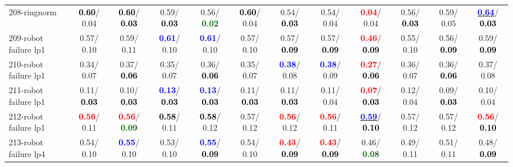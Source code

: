 \begin{table}[h]
\begin{center}
{\begin{tabular}{lc|c|c|c|c|c|c|c|c|c|c}
208-ringnorm & \textcolor{black}{\textbf{  0.60}}/  0.04 & \textcolor{black}{\textbf{  0.60}}/\textcolor{black}{\textbf{  0.03}} &   0.59/\textcolor{black}{\textbf{  0.03}} &   0.56/\textcolor{darkgreen}{\textbf{  0.02}} & \textcolor{black}{\textbf{  0.60}}/  0.04 &   0.54/\textcolor{black}{\textbf{  0.03}} &   0.54/  0.04 & \textcolor{red}{\textbf{  0.04}}/  0.04 &   0.56/\textcolor{black}{\textbf{  0.03}} &   0.59/  0.05 & \underline{\textcolor{blue}{\textbf{  0.64}}}/\textcolor{black}{\textbf{  0.03}} \\
209-robot failure lp1 &   0.57/  0.10 &   0.59/  0.11 & \textcolor{blue}{\textbf{  0.61}}/  0.10 & \textcolor{blue}{\textbf{  0.61}}/  0.10 &   0.57/  0.10 &   0.57/\textcolor{black}{\textbf{  0.09}} &   0.57/\textcolor{black}{\textbf{  0.09}} & \textcolor{red}{\textbf{  0.46}}/\textcolor{black}{\textbf{  0.09}} &   0.55/  0.10 &   0.56/\textcolor{black}{\textbf{  0.09}} &   0.59/\textcolor{black}{\textbf{  0.09}} \\
210-robot failure lp1 &   0.34/  0.07 &   0.37/\textcolor{black}{\textbf{  0.06}} &   0.35/  0.07 &   0.36/\textcolor{black}{\textbf{  0.06}} &   0.35/  0.07 & \textcolor{blue}{\textbf{  0.38}}/  0.08 & \textcolor{blue}{\textbf{  0.38}}/  0.09 & \textcolor{red}{\textbf{  0.27}}/\textcolor{black}{\textbf{  0.06}} &   0.36/  0.07 &   0.36/\textcolor{black}{\textbf{  0.06}} &   0.37/  0.08 \\
211-robot failure lp1 &   0.11/\textcolor{black}{\textbf{  0.03}} &   0.10/\textcolor{black}{\textbf{  0.03}} & \textcolor{blue}{\textbf{  0.13}}/\textcolor{black}{\textbf{  0.03}} & \textcolor{blue}{\textbf{  0.13}}/\textcolor{black}{\textbf{  0.03}} &   0.11/\textcolor{black}{\textbf{  0.03}} &   0.11/\textcolor{black}{\textbf{  0.03}} &   0.11/  0.04 & \textcolor{red}{\textbf{  0.07}}/\textcolor{black}{\textbf{  0.03}} &   0.12/  0.04 &   0.09/\textcolor{black}{\textbf{  0.03}} &   0.10/  0.04 \\
212-robot failure lp1 & \textcolor{red}{\textbf{  0.56}}/  0.11 & \textcolor{red}{\textbf{  0.56}}/\textcolor{darkgreen}{\textbf{  0.09}} & \textcolor{black}{\textbf{  0.58}}/  0.11 & \textcolor{black}{\textbf{  0.58}}/  0.12 &   0.57/  0.12 & \textcolor{red}{\textbf{  0.56}}/  0.12 & \textcolor{red}{\textbf{  0.56}}/  0.11 & \underline{\textcolor{blue}{\textbf{  0.59}}}/\textcolor{black}{\textbf{  0.10}} &   0.57/  0.12 &   0.57/  0.12 & \textcolor{red}{\textbf{  0.56}}/\textcolor{black}{\textbf{  0.10}} \\
213-robot failure lp4 &   0.54/  0.10 & \textcolor{blue}{\textbf{  0.55}}/  0.10 &   0.53/  0.10 & \textcolor{blue}{\textbf{  0.55}}/\textcolor{black}{\textbf{  0.09}} &   0.54/  0.10 & \textcolor{red}{\textbf{  0.43}}/\textcolor{black}{\textbf{  0.09}} & \textcolor{red}{\textbf{  0.43}}/\textcolor{black}{\textbf{  0.09}} &   0.46/\textcolor{darkgreen}{\textbf{  0.08}} &   0.49/  0.11 &   0.51/  0.11 &   0.48/\textcolor{black}{\textbf{  0.09}} \\ \hline

\end{tabular}}
\end{center}
\end{table}
